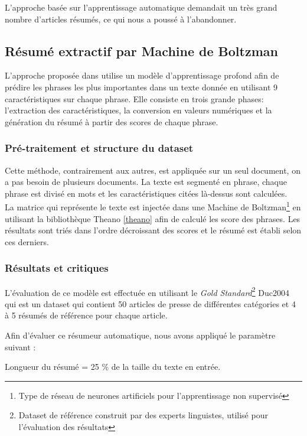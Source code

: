     L'approche basée sur l'apprentissage automatique demandait un très grand nombre d'articles résumés, ce qui nous a poussé à l'abandonner.


\subsection{Résumé extractif par Machine de Boltzman}
L'approche proposée dans \cite{boltzman} utilise un modèle d'apprentissage profond afin de prédire les phrases les plus importantes dans un texte donnée en utilisant 9 caractéristiques sur chaque phrase. Elle consiste en trois grande phases: l'extraction des caractéristiques, la conversion en valeurs numériques et la génération du résumé à partir des scores de chaque phrase. 

    \subsubsection{Pré-traitement et structure du dataset}
    Cette méthode, contrairement aux autres, est appliquée sur un seul document, on a pas besoin de plusieurs documents. La texte est segmenté en phrase, chaque phrase est divisé en mots et les caractéristiques citées là-dessus sont calculées.\\
    
    La matrice qui représente le texte est injectée dans une Machine de Boltzman\footnote{Type de réseau de neurones artificiels pour l'apprentissage non supervisé} en utilisant la bibliothèque Theano \autoref{theano} afin de calculé les score des phrases. Les résultats sont triés dans l'ordre décroissant des scores et le résumé est établi selon ces derniers.\\
    
    \subsubsection{Résultats et critiques}
    L'évaluation de ce modèle est effectuée en utilisant le \emph{Gold Standard}\footnote{Dataset de référence construit par des experts linguistes, utilisé pour l'évaluation des résultats} Duc2004 qui est un dataset qui contient 50 articles de presse de différentes catégories et 4 à 5 résumés de référence pour chaque article.
    
    Afin d'évaluer ce résumeur automatique, nous avons appliqué le paramètre suivant :
    
    Longueur du résumé = 25 \% de la taille du texte en entrée.
    
